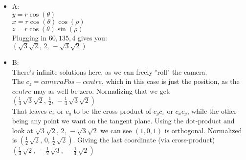 \begin{itemize}

\item A: \\

$y=r\cos(\theta)$\\
$x=r\cos(\theta)\cos(\rho)$ \\
$z=r\cos(\theta)\sin(\rho)$ \\

Plugging in $60,135,4$ gives you: \\
$\left(\sqrt{3} \sqrt{2},\,2,\,-\sqrt{3} \sqrt{2}\right)$ \\

\item B: \\

There's infinite solutions here, as we can freely "roll" the camera. \\
The $c_z = cameraPos-centre$, which in this case is just the position, as the $centre$ may as well be zero. Normalizing that we get: $\left(\frac{1}{4} \, \sqrt{3} \sqrt{2},\,\frac{1}{2},\,-\frac{1}{4} \, \sqrt{3} \sqrt{2}\right)$ \\

That leaves $c_x$ or $c_y$ to be the cross product of $c_y c_z$ or $c_x c_y$, while the other being any point we want on the tangent plane. Using the dot-product and look at $\sqrt{3} \sqrt{2},\,2,\,-\sqrt{3} \sqrt{2}$ we can see $(1,0,1)$ is orthogonal. Normalized is $\left(\frac{1}{2} \, \sqrt{2},\,0,\,\frac{1}{2} \, \sqrt{2}\right)$. Giving the last coordinate (via cross-product) $\left(\frac{1}{4} \, \sqrt{2},\,-\frac{1}{2} \, \sqrt{3},\,-\frac{1}{4} \, \sqrt{2}\right)$

\end{itemize}
